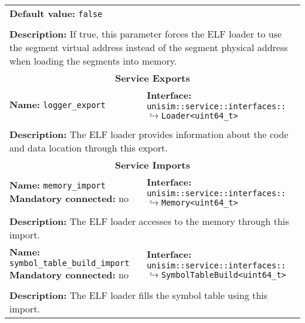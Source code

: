 \begin{center}
\begin{tabular}{|p{7.5cm}|p{7.5cm}|}
		\multicolumn{2}{|p{15cm}|}{\textbf{Default value:} \texttt{false}}\\
		\multicolumn{2}{|l|}{}\\
		\multicolumn{2}{|p{15cm}|}{\textbf{Description:} \newline If true, this parameter forces the ELF loader to use the segment virtual address instead of the segment physical address when loading the segments into memory.}\\
		\hline
		\hline
		\multicolumn{2}{|c|}{\textbf{\large Service Exports}}\\
		\hline
		\multicolumn{1}{|p{7.5cm}}{\textbf{Name:} \texttt{logger\_export}} & \multicolumn{1}{p{7.5cm}|}{\textbf{Interface:} \newline \texttt{unisim::service::interfaces::} \newline$\hookrightarrow$\texttt{Loader<uint64\_t>}}\\
		\multicolumn{2}{|l|}{}\\
		\multicolumn{2}{|p{15cm}|}{\textbf{Description:} \newline The ELF loader provides information about the code and data location through this export.}\\
		\hline
		\hline
		\multicolumn{2}{|c|}{\textbf{\large Service Imports}}\\
		\hline
		\multicolumn{1}{|p{7.5cm}}{\textbf{Name:} \texttt{memory\_import} \newline \textbf{Mandatory connected:} no} & \multicolumn{1}{p{7.5cm}|}{\textbf{Interface:} \newline \texttt{unisim::service::interfaces::} \newline$\hookrightarrow$\texttt{Memory<uint64\_t>}}\\
		\multicolumn{2}{|l|}{}\\
		\multicolumn{2}{|p{15cm}|}{\textbf{Description:} \newline The ELF loader accesses to the memory through this import.}\\
		\hline
		\multicolumn{1}{|p{7.5cm}}{\textbf{Name:} \texttt{symbol\_table\_build\_import} \newline \textbf{Mandatory connected:} no} & \multicolumn{1}{p{7.5cm}|}{\textbf{Interface:} \newline \texttt{unisim::service::interfaces::} \newline$\hookrightarrow$\texttt{SymbolTableBuild<uint64\_t>}}\\
		\multicolumn{2}{|l|}{}\\
		\multicolumn{2}{|p{15cm}|}{\textbf{Description:} \newline The ELF loader fills the symbol table using this import.}\\
		\hline
	\end{tabular}
\end{center}


